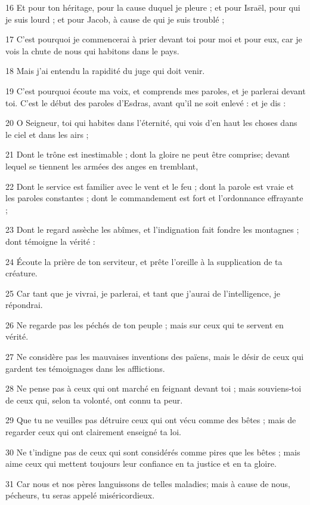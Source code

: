 \par 16 Et pour ton héritage, pour la cause duquel je pleure ; et pour Israël, pour qui je suis lourd ; et pour Jacob, à cause de qui je suis troublé ;
\par 17 C'est pourquoi je commencerai à prier devant toi pour moi et pour eux, car je vois la chute de nous qui habitons dans le pays.
\par 18 Mais j'ai entendu la rapidité du juge qui doit venir.
\par 19 C'est pourquoi écoute ma voix, et comprends mes paroles, et je parlerai devant toi. C'est le début des paroles d'Esdras, avant qu'il ne soit enlevé : et je dis :
\par 20 O Seigneur, toi qui habites dans l'éternité, qui vois d'en haut les choses dans le ciel et dans les airs ;
\par 21 Dont le trône est inestimable ; dont la gloire ne peut être comprise; devant lequel se tiennent les armées des anges en tremblant,
\par 22 Dont le service est familier avec le vent et le feu ; dont la parole est vraie et les paroles constantes ; dont le commandement est fort et l'ordonnance effrayante ;
\par 23 Dont le regard assèche les abîmes, et l'indignation fait fondre les montagnes ; dont témoigne la vérité :
\par 24 Écoute la prière de ton serviteur, et prête l'oreille à la supplication de ta créature.
\par 25 Car tant que je vivrai, je parlerai, et tant que j'aurai de l'intelligence, je répondrai.
\par 26 Ne regarde pas les péchés de ton peuple ; mais sur ceux qui te servent en vérité.
\par 27 Ne considère pas les mauvaises inventions des païens, mais le désir de ceux qui gardent tes témoignages dans les afflictions.
\par 28 Ne pense pas à ceux qui ont marché en feignant devant toi ; mais souviens-toi de ceux qui, selon ta volonté, ont connu ta peur.
\par 29 Que tu ne veuilles pas détruire ceux qui ont vécu comme des bêtes ; mais de regarder ceux qui ont clairement enseigné ta loi.
\par 30 Ne t'indigne pas de ceux qui sont considérés comme pires que les bêtes ; mais aime ceux qui mettent toujours leur confiance en ta justice et en ta gloire.
\par 31 Car nous et nos pères languissons de telles maladies; mais à cause de nous, pécheurs, tu seras appelé miséricordieux.
